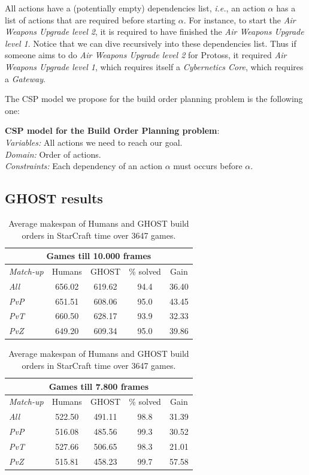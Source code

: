 \documentclass[journal]{IEEEtran}
\newcommand{\csp}{\textsc{CSP}\xspace}
\newcommand{\ghost}{\textsc{GHOST}\xspace}
\newcommand{\ie}{\textit{i.e.}}
\newcommand{\modelcsp}[4]%
{ \begin{trivlist}
  \item[]%
    \textbf{CSP model for #1}:\\
    \textit{Variables:} #2\\
    \textit{Domain:} #3\\
    \textit{Constraints:} #4
  \end{trivlist}%
}
\begin{document}
All  actions have  a (potentially  empty) dependencies  list, \ie,  an
action  $\alpha$  has a  list  of  actions  that are  required  before
starting  $\alpha$.  For  instance, to  start the  \textit{Air Weapons
  Upgrade level  2}, it is  required to have finished  the \textit{Air
  Weapons Upgrade level  1}. Notice that we can  dive recursively into
these  dependencies  list. Thus  if  someone  aims to  do  \textit{Air
  Weapons  Upgrade  level  2}  for Protoss,  it  required  \textit{Air
  Weapons    Upgrade   level    1},    which    requires   itself    a
\textit{Cybernetics Core}, which requires a \textit{Gateway}.

The \csp model we propose for  the build order planning problem is the
following one:

\modelcsp{the Build Order Planning problem}%
{All actions we need to reach our goal.}%
{Order of actions.}%
{Each dependency of an action $\alpha$ must occurs before $\alpha$.}

\subsection{\ghost results}

\begin{table}[tba]
  \label{tbl:bo}
  \centering
  \caption{Average makespan of Humans and \ghost build orders in StarCraft time over 3647
    games.}
  \begin{tabular}{|l|c|c|c|c|} 
    \hline
    \multicolumn{5}{|c|}{ Games till 10.000 frames} \\ 
    \hline
    {\em Match-up} & Humans & \ghost & \% solved &
    Gain \\ 
    \hline
    {\em All} & 656.02 & 619.62 & 94.4 & 36.40\\
    {\em PvP} & 651.51 & 608.06 & 95.0 & 43.45\\
    {\em PvT} & 660.50 & 628.17 & 93.9 & 32.33\\
    {\em PvZ} & 649.20 & 609.34 & 95.0 & 39.86\\
    \hline
  \end{tabular}
  \begin{tabular}{|l|c|c|c|c|} 
    \hline
    \multicolumn{5}{|c|}{ Games till 7.800 frames} \\ 
    \hline
    {\em Match-up} & Humans & \ghost & \% solved &
    Gain \\ 
    \hline
    {\em All} & 522.50 & 491.11 & 98.8 & 31.39\\
    {\em PvP} & 516.08 & 485.56 & 99.3 & 30.52\\
    {\em PvT} & 527.66 & 506.65 & 98.3 & 21.01\\
    {\em PvZ} & 515.81 & 458.23 & 99.7 & 57.58\\ 
    \hline
  \end{tabular}  
\end{table}
\end{document}
